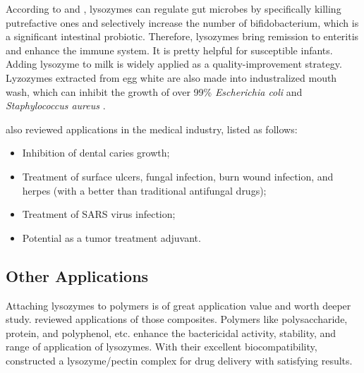 According to \cite{Yu-tong2006} and \cite{ZHAI2015}, lysozymes can regulate gut microbes by specifically killing putrefactive ones and selectively increase the number of bifidobacterium, which is a significant intestinal probiotic. Therefore, lysozymes bring remission to enteritis and enhance the immune system. It is pretty helpful for susceptible infants.  Adding lysozyme to milk is widely applied as a quality-improvement strategy.
Lyzozymes extracted from egg white are also made into industralized mouth wash, which can inhibit the growth of over 99\% \textit{Escherichia coli} and \textit{Staphylococcus aureus} \citep{Unknown2020}.

\citet{He2008} also reviewed applications in the medical industry, listed as follows:
\begin{itemize}
	\item Inhibition of dental caries growth;
	\item Treatment of surface ulcers, fungal infection, burn wound infection, and herpes (with a better than traditional antifungal drugs);
	\item Treatment of SARS virus infection;
	\item Potential as a tumor treatment adjuvant.
\end{itemize}

\subsection{Other Applications}
Attaching lysozymes to polymers is of great application value and worth deeper study. \cite{Le-chuan2020} reviewed applications of those composites. Polymers like polysaccharide, protein, and polyphenol, etc. enhance the bactericidal activity, stability, and range of application of lysozymes. With their excellent biocompatibility, \citet{Lin2015} constructed a lysozyme/pectin complex for drug delivery with satisfying results.

